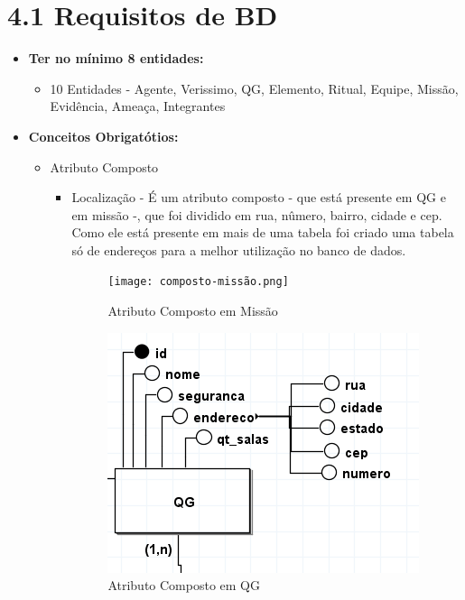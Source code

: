 \documentclass[12pt,a4paper]{report}
\begin{document}
\section{4.1 Requisitos de BD}
\begin{itemize}
    \item \textbf{Ter no mínimo 8 entidades: }
    \begin{itemize}
        \item 10 Entidades - Agente, Verissimo, QG, Elemento, Ritual, Equipe, Missão, Evidência, Ameaça, Integrantes
    \end{itemize}

    \item \textbf{Conceitos Obrigatótios: }
    \begin{itemize}
        \item Atributo Composto
            \begin{itemize}
                \item Localização - É um atributo composto - que está presente em QG e em missão -, que foi dividido em rua, nûmero, bairro, cidade e cep.
                Como ele está presente em mais de uma tabela foi criado uma tabela só de endereços para a melhor utilização no banco de dados.

            \begin{figure}[H]
                \centering
                    \begin{minipage}[b]{0.45\linewidth}
                        \centering
                        \texttt{[image: composto-missão.png]}
                        \caption{Atributo Composto em Missão}
                        \label{fig:composto-missão}
                    \end{minipage}
                \hfill
                    \begin{minipage}[b]{0.45\linewidth}
                        \centering
                        \includegraphics[width=\linewidth]{composto-qg.png}
                        \caption{Atributo Composto em QG}
                        \label{fig:herence-threats}
                    \end{minipage}
                \end{figure}
            \end{itemize}
            

\end{itemize}
\end{itemize}
\end{document}
